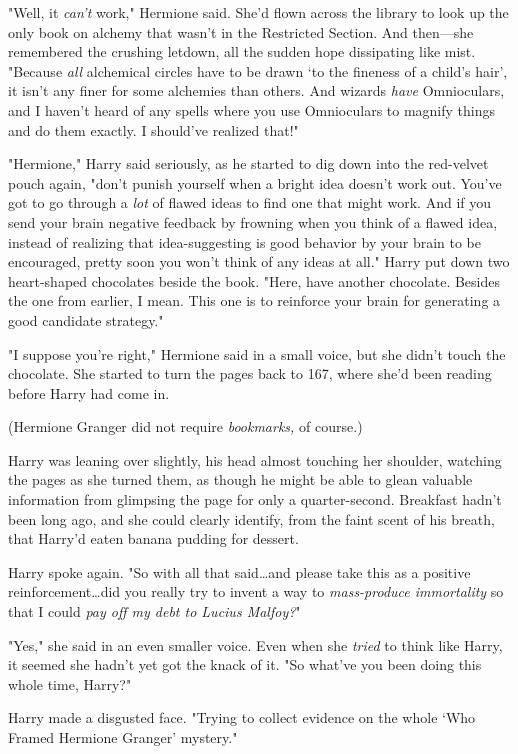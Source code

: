 "Well, it \emph{can’t} work," Hermione said. She’d flown across the library to
look up the only book on alchemy that wasn’t in the Restricted Section. And
then—she remembered the crushing letdown, all the sudden hope dissipating
like mist. "Because \emph{all} alchemical circles have to be drawn ‘to the
fineness of a child’s hair’, it isn’t any finer for some alchemies than others.
And wizards \emph{have} Omnioculars, and I haven’t heard of any spells where
you use Omnioculars to magnify things and do them exactly. I should’ve realized
that!"

"Hermione," Harry said seriously, as he started to dig down into the red-velvet
pouch again, "don’t punish yourself when a bright idea doesn’t work out. You’ve
got to go through a \emph{lot} of flawed ideas to find one that might work. And
if you send your brain negative feedback by frowning when you think of a flawed
idea, instead of realizing that idea-suggesting is good behavior by your brain
to be encouraged, pretty soon you won’t think of any ideas at all." Harry put
down two heart-shaped chocolates beside the book. "Here, have another
chocolate. Besides the one from earlier, I mean. This one is to reinforce your
brain for generating a good candidate strategy."

"I suppose you’re right," Hermione said in a small voice, but she didn’t touch
the chocolate. She started to turn the pages back to 167, where she’d been
reading before Harry had come in.

(Hermione Granger did not require \emph{bookmarks,} of course.)

Harry was leaning over slightly, his head almost touching her shoulder,
watching the pages as she turned them, as though he might be able to glean
valuable information from glimpsing the page for only a quarter-second.
Breakfast hadn’t been long ago, and she could clearly identify, from the faint
scent of his breath, that Harry’d eaten banana pudding for dessert.

Harry spoke again. "So with all that said…and please take this as a
positive reinforcement…did you really try to invent a way to
\emph{mass-produce immortality} so that I could \emph{pay off my debt to Lucius
Malfoy?}"

"Yes," she said in an even smaller voice. Even when she \emph{tried} to think
like Harry, it seemed she hadn’t yet got the knack of it. "So what’ve you been
doing this whole time, Harry?"

Harry made a disgusted face. "Trying to collect evidence on the whole ‘Who
Framed Hermione Granger’ mystery."

